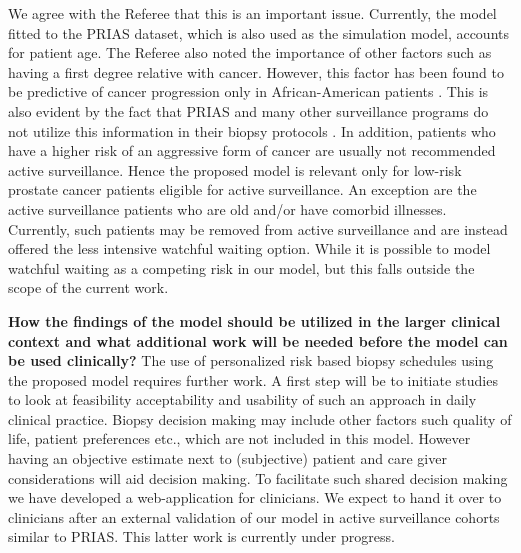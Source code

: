 \begin{enumerate}
    We agree with the Referee that this is an important issue. Currently, the model fitted to the PRIAS dataset, which is also used as the simulation model, accounts for patient age. The Referee also noted the importance of other factors such as having a first degree relative with cancer. However, this factor has been found to be predictive of cancer progression only in African-American patients \citep{telang2017prostate,goh2013clinical}. This is also evident by the fact that PRIAS and many other surveillance programs do not utilize this information in their biopsy protocols \citep{bokhorst2016decade,nieboer2018active}. In addition, patients who have a higher risk of an aggressive form of cancer are usually not recommended active surveillance. Hence the proposed model is relevant only for low-risk prostate cancer patients eligible for active surveillance. An exception are the active surveillance patients who are old and/or have comorbid illnesses. Currently, such patients may be removed from active surveillance and are instead offered the less intensive watchful waiting \citep{bokhorst2016decade} option. While it is possible to model watchful waiting as a competing risk in our model, but this falls outside the scope of the current work. 

    \textbf{How the findings of the model should be utilized in the larger clinical context and what additional work will be needed before the model can be used clinically?}
    The use of personalized risk based biopsy schedules using the proposed model requires further work. A first step will be to initiate studies to look at feasibility acceptability and usability of such an approach in daily clinical practice. Biopsy decision making may include other factors such quality of life, patient preferences etc., which are not included in this model. However having an objective estimate next to (subjective) patient and care giver considerations will aid decision making. To facilitate such shared decision making we have developed a web-application for clinicians. We expect to hand it over to clinicians after an external validation of our model in active surveillance cohorts similar to PRIAS. This latter work is currently under progress.
    
\end{enumerate}

